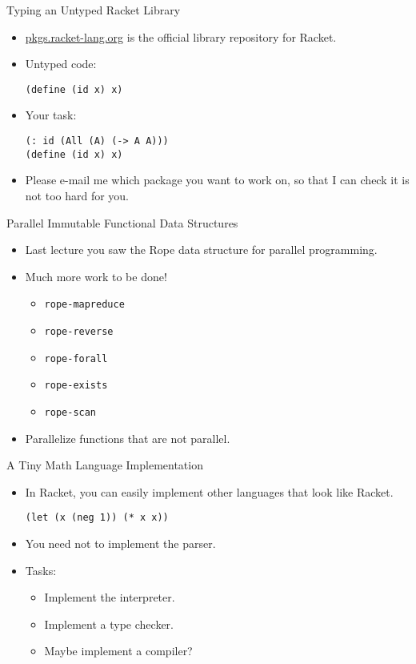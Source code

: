 \documentclass{beamer}
\begin{document}
\begin{frame}[fragile]{Typing an Untyped Racket Library}
  \begin{itemize}
  \item \url{pkgs.racket-lang.org} is the official library repository for Racket.
  \pause{} \item Untyped code:
    \begin{lstlisting}[style=Racket]
(define (id x) x)
    \end{lstlisting}
  \pause{} \item Your task:
    \begin{lstlisting}[style=Racket]
(: id (All (A) (-> A A)))
(define (id x) x)
    \end{lstlisting}
  \pause{} \item Please e-mail me which package you want to work on, so that I can check it is not too hard for you.
  \end{itemize}
\end{frame}

\begin{frame}{Parallel Immutable Functional Data Structures}
  \begin{itemize}
  \item Last lecture you saw the Rope data structure for parallel programming.
  \pause{} \item Much more work to be done!
    \begin{itemize}
    \item \lstinline[style=Racket]{rope-mapreduce}
    \item \lstinline[style=Racket]{rope-reverse}
    \item \lstinline[style=Racket]{rope-forall}
    \item \lstinline[style=Racket]{rope-exists}
    \item \lstinline[style=Racket]{rope-scan}
    \end{itemize}
  \pause{} \item Parallelize functions that are not parallel.
  \end{itemize}
\end{frame}

\begin{frame}[fragile]{A Tiny Math Language Implementation}
  \begin{itemize}
  \item In Racket, you can easily implement other languages that look like Racket.
    \begin{lstlisting}[style=Racket]
(let (x (neg 1)) (* x x))
    \end{lstlisting}
  \pause{} \item You need not to implement the parser.
  \pause{} \item Tasks:
    \begin{itemize}
    \item Implement the interpreter.
    \item Implement a type checker.
    \item Maybe implement a compiler?
    \end{itemize}
  \end{itemize}
\end{frame}
\end{document}
